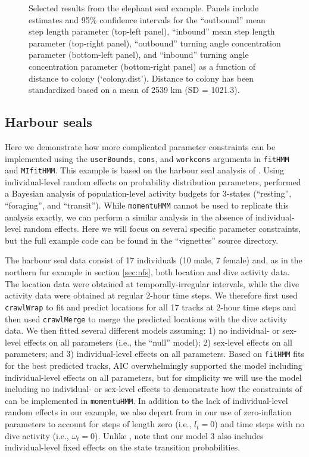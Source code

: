 \documentclass[12pt]{article}\usepackage[]{graphicx}\usepackage[]{color}
\begin{document}
\begin{figure}[htbp]
  \caption{Selected results from the elephant seal example. Panels include estimates and 95\% confidence intervals for the ``outbound'' mean step length parameter (top-left panel), ``inbound'' mean step length parameter (top-right panel), ``outbound'' turning angle concentration parameter (bottom-left panel), and ``inbound'' turning angle concentration parameter (bottom-right panel) as a function of distance to colony (`colony.dist'). Distance to colony has been standardized based on a mean of 2539 km (SD = 1021.3).}
  \label{fig:sesResults}
\end{figure}

\subsection{Harbour seals}
\label{sec:harbourSeal}
Here we demonstrate how more complicated parameter constraints can be implemented using the \verb|userBounds|, \verb|cons|, and \verb|workcons| arguments in \verb|fitHMM| and \verb|MIfitHMM|. This example is based on the harbour seal analysis of \cite{McClintockEtAl2013c}. Using individual-level random effects on probability distribution parameters, \cite{McClintockEtAl2013c} performed a Bayesian analysis of population-level activity budgets for 3-states (``resting'', ``foraging'', and ``transit''). While \verb|momentuHMM| cannot be used to replicate this analysis exactly, we can perform a similar analysis in the absence of individual-level random effects. Here we will focus on several specific parameter constraints, but the full example code can be found in the ``vignettes'' source directory. 

The harbour seal data consist of 17 individuals (10 male, 7 female) and, as in the northern fur example in section \ref{sec:nfs}, both location and dive activity data. The location data were obtained at temporally-irregular intervals, while the dive activity data were obtained at regular 2-hour time steps. We therefore first used \verb|crawlWrap| to fit and predict locations for all 17 tracks at 2-hour time steps and then used \verb|crawlMerge| to merge the predicted locations with the dive activity data. We then fitted several different models assuming: 1) no individual- or sex-level effects on all parameters (i.e., the ``null'' model); 2) sex-level effects on all parameters; and 3) individual-level effects on all parameters.  Based on \verb|fitHMM| fits for the best predicted tracks, AIC overwhelmingly supported the model including individual-level effects on all parameters, but for simplicity we will use the model including no individual- or sex-level effects to demonstrate how the constraints of \cite{McClintockEtAl2013c} can be implemented in \verb|momentuHMM|.  In addition to the lack of individual-level random effects in our example, we also depart from \cite{McClintockEtAl2013c} in our use of zero-inflation parameters to account for steps of length zero (i.e., $l_t=0$) and time steps with no dive activity (i.e., $\omega_t=0$). Unlike \cite{McClintockEtAl2013c}, note that our model 3 also includes individual-level fixed effects on the state transition probabilities.
\end{document}

